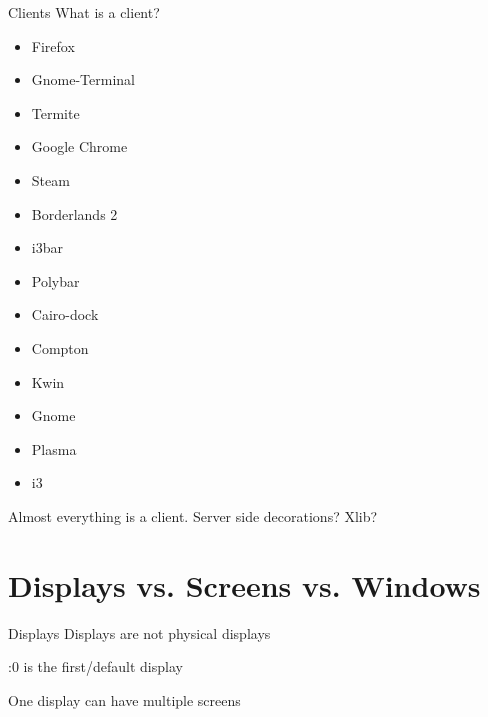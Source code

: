 \documentclass[10pt]{beamer}
\begin{document}
\begin{frame}[fragile]{Clients}
  What is a client?
  \pause
  \begin{itemize}
    \item Firefox
    \item Gnome-Terminal
    \item Termite
    \item Google Chrome
    \item Steam
    \item Borderlands 2
  \end{itemize}
  \pause
  \begin{itemize}[<+->]
    \item i3bar
    \item Polybar
    \item Cairo-dock
    \item Compton
    \item Kwin
    \item Gnome
    \item Plasma
    \item i3
  \end{itemize}

  \onslide<+->
  Almost everything is a client.
  \onslide<+->
  Server side decorations?
  \onslide<+->
  Xlib?
\end{frame}

\section{Displays vs. Screens vs. Windows}

\begin{frame}[fragile]{Displays}
  Displays are not physical displays

  \pause
  :0 is the first/default display

  \pause
  One display can have multiple screens

\end{frame}
\end{document}
